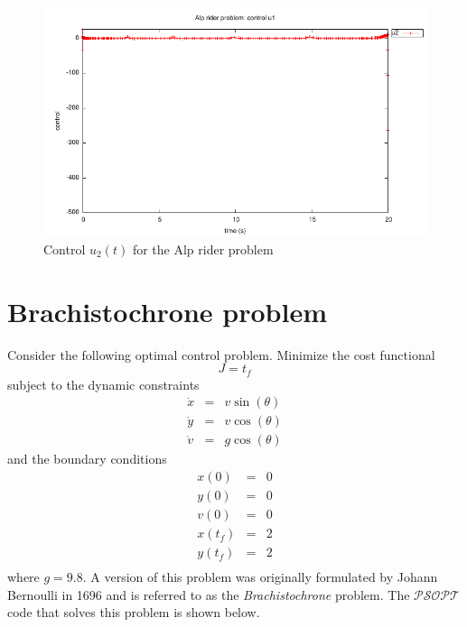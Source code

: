 \documentclass[a4paper,11pt]{report}    %
\newcommand{\psopt}{$\mathcal{PSOPT}$\,}  %
\begin{document}
\begin{figure}
  \centering
  \includegraphics{../examples/alpine/alpine_control2}
  \caption{Control $u_2(t)$ for the Alp rider  problem}
  \label{alpine_control2}
\end{figure}


\section{Brachistochrone problem}
Consider the following optimal control problem.  Minimize the cost functional
\begin{equation}
  J = t_f
\end{equation}
subject to the dynamic constraints
\begin{equation}
  \begin{array}{lcl}
    \dot x & = & v \sin(\theta) \\
    \dot y & = & v \cos(\theta) \\
    \dot v & = & g \cos(\theta) 
  \end{array}
\end{equation}
and the boundary conditions
\begin{equation}
  \begin{array}{lcl}
    x(0) & = & 0 \\
    y(0) & = & 0 \\
    v(0) & = & 0 \\
    x(t_f) & = & 2 \\
    y(t_f) & = & 2 \\
  \end{array}
\end{equation}
where $g=9.8$. A version of this problem was originally formulated by Johann Bernoulli in 1696 and is referred to as the {\em Brachistochrone} problem.  The
\psopt code that solves this problem is shown below.  
\end{document}
